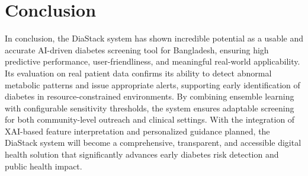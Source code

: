 \documentclass[conference, letterpaper]{IEEEtran}
\begin{document}
\section{Conclusion}
\label{sec:con}
In conclusion, the DiaStack system has shown incredible potential as a usable and accurate AI-driven diabetes screening tool for Bangladesh, ensuring high predictive performance, user-friendliness, and meaningful real-world applicability. Its evaluation on real patient data confirms its ability to detect abnormal metabolic patterns and issue appropriate alerts, supporting early identification of diabetes in resource-constrained environments. By combining ensemble learning with configurable sensitivity thresholds, the system ensures adaptable screening for both community-level outreach and clinical settings. With the integration of XAI-based feature interpretation and personalized guidance planned, the DiaStack system will become a comprehensive, transparent, and accessible digital health solution that significantly advances early diabetes risk detection and public health impact.











%
%
%







\end{document}
